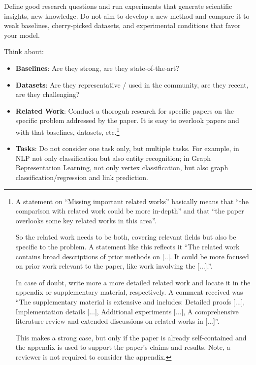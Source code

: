 \documentclass[sigconf, review, nonacm]{acmart}
\begin{document}
\begin{tcolorbox}[title=What is Strong and Ego-less Research?,colback=red!20]
Define good research questions and run experiments that generate scientific insights, \ie new knowledge.
Do not aim to develop a new method and compare it to weak baselines, cherry-picked datasets, and experimental conditions that favor your model.

Think about:

\begin{itemize}
\item \textbf{Baselines}: Are they strong, are they state-of-the-art?

\item \textbf{Datasets}: Are they representative / used in the community, are they recent, are they challenging?

\item \textbf{Related Work}:  Conduct a thoroguh research for specific papers on the specific problem addressed by the paper. It is easy to overlook papers and with that baselines, datasets, etc.\footnote{A statement on ``Missing important related works'' basically means that ``the comparison with related work could be more in-depth'' and that ``the paper overlooks some key related works in this area''. 

So the related work needs to be both, covering relevant fields but also be specific to the problem. A statement like this reflects it ``The related work contains broad descriptions of prior methods on [..]. It could be more focused on prior work relevant to the paper, like work involving the [...].''.

In case of doubt, write more a more detailed related work and locate it in the appendix or supplementary material, respectively. A comment received was ``The supplementary material is extensive and includes: Detailed proofs [...], Implementation details [...], Additional experiments [...],  A comprehensive literature review and extended discussions on related works in [...]''. 

This makes a strong case, but only if the paper is already self-contained and the appendix is used to support the paper's claims and results. 
Note, a reviewer is not required to consider the appendix.}


\item \textbf{Tasks}: Do not consider one task only, but multiple tasks. 
For example, in NLP not only classification but also entity recognition; in Graph Representation Learning, not only vertex classification, but also graph classification/regression and link prediction.
\end{itemize}

\end{tcolorbox}
\end{document}
